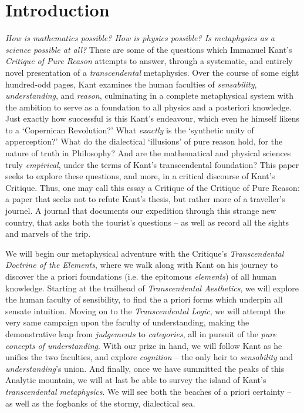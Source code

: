 \section*{Introduction}
\emph{How is mathematics possible? How is physics possible? Is metaphysics as a science possible at all?} These are some of the questions which Immanuel Kant's \emph{Critique of Pure Reason} attempts to answer, through a systematic, and entirely novel presentation of a \emph{transcendental} metaphysics. Over the course of some eight hundred-odd pages, Kant examines the human faculties of \emph{sensability}, \emph{understanding}, and \emph{reason}, culminating in a complete metaphysical system with the ambition to serve as a foundation to all physics and a posteriori knowledge. Just exactly how successful is this Kant's endeavour, which even he himself likens to a `Copernican Revolution?' What \emph{exactly} is the `synthetic unity of apperception?' What do the dialectical `illusions' of pure reason hold, for the nature of truth in Philosophy? And are the mathematical and physical sciences truly \emph{empirical}, under the terms of Kant's transcendental foundation? This paper seeks to explore these questions, and more, in a critical discourse of Kant's Critique. Thus, one may call this essay a Critique of the Critique of Pure Reason: a paper that seeks not to refute Kant's thesis, but rather more of a traveller's journel. A journal that documents our expedition through this strange new country, that asks both the tourist's questions -- as well as record all the sights and marvels of the trip.

We will begin our metaphysical adventure with the Critique's \emph{Transcendental Doctrine of the Elements}, where we walk along with Kant on his journey to discover the a priori foundations (i.e. the epitomous \emph{elements}) of all human knowledge. Starting at the trailhead of \emph{Transcendental Aesthetics}, we will explore the human faculty of sensibility, to find the a priori forms which underpin all sensate intuition. Moving on to the \emph{Transcendental Logic}, we will attempt the very same campaign upon the faculty of understanding, making the demonstrative leap from \emph{judgements} to \emph{categories}, all in pursuit of the \emph{pure concepts of understanding}. With our prize in hand, we will follow Kant as he unifies the two faculties, and explore \emph{cognition} -- the only heir to \emph{sensability} and \emph{understanding}'s union. And finally, once we have summitted the peaks of this Analytic mountain, we will at last be able to survey the island of Kant's \emph{transcendental metaphysics}. We will see both the beaches of a priori certainty -- as well as the fogbanks of the stormy, dialectical sea.
